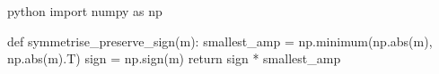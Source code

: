 \documentclass[a4paper,12pt]{article}
\begin{document}
\begin{refsection}
{\singlespacing
\begin{tcbminted}{python}
import numpy as np

def symmetrise_preserve_sign(m):
    smallest_amp = np.minimum(np.abs(m), np.abs(m).T)
    sign = np.sign(m)
    return sign * smallest_amp
\end{tcbminted}
}

\clearpage

\AtNextBibliography{\small}
\printbibliography{}
\clearpage    %

\end{refsection}
\end{document}
